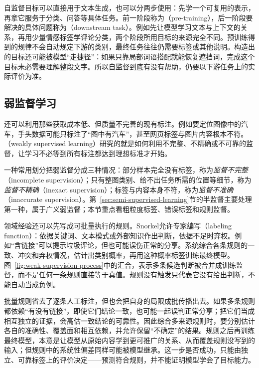 自监督目标可以直接用于文本生成，也可以分两步使用：先学一个可复用的表示，再拿它服务于分类、问答等具体任务。前一阶段称为（pre-training），后一阶段要解决的具体问题称为（downstream task）。例如先让模型学习文本与上下文的关系，再用少量情感标签学评论分类，两个阶段所用目标的来源完全不同。预训练得到的规律不会自动规定下游的类别，最终任务往往仍需要标签或其他说明。构造出的目标还可能被模型“走捷径”：如果只靠局部词语搭配就能恢复遮挡词，完成这个目标未必需要理解整段文字。所以自监督到底有没有帮助，仍要以下游任务上的实际评价为准。

\subsection{弱监督学习}
\label{sec:weakly-supervised-learning}

还可以利用那些获取成本低、但质量不完善的现有标注。例如要定位图像中的汽车，手头数据可能只标注了“图中有汽车”，甚至网页标签与图片内容根本不符。（weakly supervised learning）研究的就是如何利用不完整、不精确或不可靠的监督，让学习不必等到所有标注都达到理想标准才开始。

一种常用划分把弱监督分成三种情况：部分样本完全没有标签，称为\emph{监督不完整}（incomplete supervision）；只有整图类别、给不出任务所需的位置等细节，称为\emph{监督不精确}（inexact supervision）；标签与内容本身不符，称为\emph{监督不准确}（inaccurate supervision）。第~\ref{sec:semi-supervised-learning}节的半监督主要处理第一种，属于广义弱监督；本节重点看粗粒度标签、错误标签和规则监督。

领域经验还可以先写成可批量执行的规则。Snorkel允许专家编写（labeling function）：依据关键词、文本模式或外部知识作出判断，依据不足时弃权。例如“含链接”可以提示垃圾评论，但也可能误伤正常的分享。系统综合各条规则的一致、冲突和弃权情况，估计出类别概率，再用这种概率标签训练最终模型。图~\ref{fig:weak-supervision-process}中的汇合，表示多条候选判断被合并成训练监督，而不是任何一条规则直接等于真值。规则没有触发只代表它没有给出判断，不能自动当成负例。

批量规则省去了逐条人工标注，但也会把自身的局限成批传播出去。如果多条规则都依赖“有没有链接”，即使它们结论一致，也可能一起误判正常分享；把它们当成相互独立的证据，会高估一致结论的可靠性。因此综合多来源规则时，要分别估计各自的准确性、覆盖面和相互依赖，并允许保留“不确定”的结果。规则之后再训练最终模型，本意是让模型从原始内容学到更可推广的关系、从而覆盖规则没写到的输入；但规则中的系统性偏差同样可能被模型继承。这一步是否成功，只能由独立、可靠标签上的评价决定——预测符合规则，并不能证明模型学会了目标能力。

